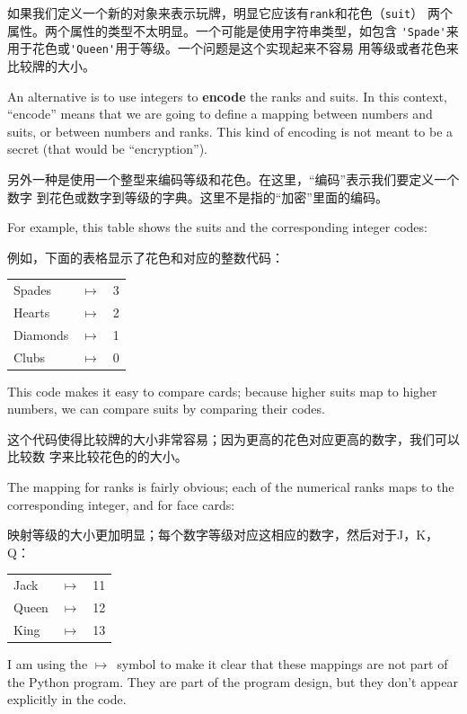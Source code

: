 \documentclass[10pt]{book}
\begin{document}
\begin{CJK}{UTF8}{gbsn}
如果我们定义一个新的对象来表示玩牌，明显它应该有{\tt rank}和花色（{\tt suit}）
两个属性。两个属性的类型不太明显。一个可能是使用字符串类型，如包含
\verb"'Spade'"来用于花色或\verb"'Queen'"用于等级。一个问题是这个实现起来不容易
用等级或者花色来比较牌的大小。

An alternative is to use integers to {\bf encode} the ranks and suits.
In this context, ``encode'' means that we are going to define a mapping
between numbers and suits, or between numbers and ranks.  This
kind of encoding is not meant to be a secret (that
would be ``encryption'').

另外一种是使用一个整型来编码等级和花色。在这里，``编码''表示我们要定义一个数字
到花色或数字到等级的字典。这里不是指的``加密''里面的编码。

\newcommand{\mymapsto}{$\mapsto$}

For example, this table shows the suits and the corresponding integer
codes:

例如，下面的表格显示了花色和对应的整数代码：

\begin{tabular}{l c l}
Spades & \mymapsto & 3 \\
Hearts & \mymapsto & 2 \\
Diamonds & \mymapsto & 1 \\
Clubs & \mymapsto & 0
\end{tabular}

This code makes it easy to compare cards; because higher suits map to
higher numbers, we can compare suits by comparing their codes.

这个代码使得比较牌的大小非常容易；因为更高的花色对应更高的数字，我们可以比较数
字来比较花色的的大小。

The mapping for ranks is fairly obvious; each of the numerical ranks
maps to the corresponding integer, and for face cards:

映射等级的大小更加明显；每个数字等级对应这相应的数字，然后对于J，K，Q：

\begin{tabular}{l c l}
Jack & \mymapsto & 11 \\
Queen & \mymapsto & 12 \\
King & \mymapsto & 13 \\
\end{tabular}

I am using the \mymapsto~symbol to make it clear that these mappings
are not part of the Python program.  They are part of the program
design, but they don't appear explicitly in the code.


\end{CJK}
\end{document}
